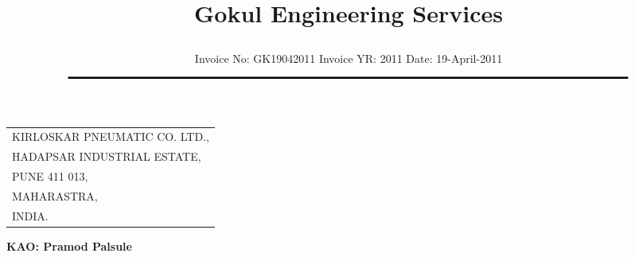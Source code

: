 \documentclass[11pt]{article}
\title{\vspace*{1cm} \centerline{ \Huge { \bf \hspace{0cm} Gokul Engineering Services}\vspace*{-0.5cm}}}
\author{%
 \scriptsize Invoice No: GK19042011  \hspace*{4cm}  Invoice YR: 2011 \hspace*{4cm} Date:  19-April-2011\\
$\rule{7.0in}{0.5mm}$}
\date{}
\begin{document}
\maketitle
\thispagestyle{empty}
\vspace*{0cm}	
\begin{flushleft}
{\small{
\begin{tabular}{l}
KIRLOSKAR PNEUMATIC CO. LTD.,   \\
HADAPSAR INDUSTRIAL ESTATE, \\ 
PUNE 411 013, \\
MAHARASTRA,\\
INDIA. \\
\end{tabular}
}}
\end{flushleft}

\vspace*{-2cm}\hfill{\bf KAO: Pramod Palsule}\
\vspace*{2cm}


\end{document}
